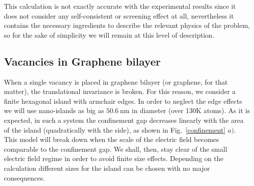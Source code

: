 This calculation is not exactly accurate with the experimental results\cite{Zhang2009} since it does not consider any self-consistent or screening effect at all, nevertheless it contains the necessary ingredients to describe the relevant physics of the problem, so for the sake of simplicity we will remain at this level of description.



\subsection{Vacancies in Graphene bilayer}
When a single vacancy is placed in graphene bilayer (or graphene, for that matter), the translational invariance is broken. For this reason, we consider a finite hexagonal island with armchair edges. In order to neglect the edge effects we will use nano-islands as big as $\SI{50.6}{\nm}$ in diameter (over 130K atoms). %
As it is expected, in such a system the confinement gap decreases linearly with the area of the island (quadratically with the side), as shown in Fig.~\ref{confinement} $a)$. This model will break down when the scale of the electric field becomes comparable to the confinement gap. We shall, then, stay clear of the small electric field regime in order to avoid finite size effects. Depending on the calculation different sizes for the island can be chosen with no major consequences.
